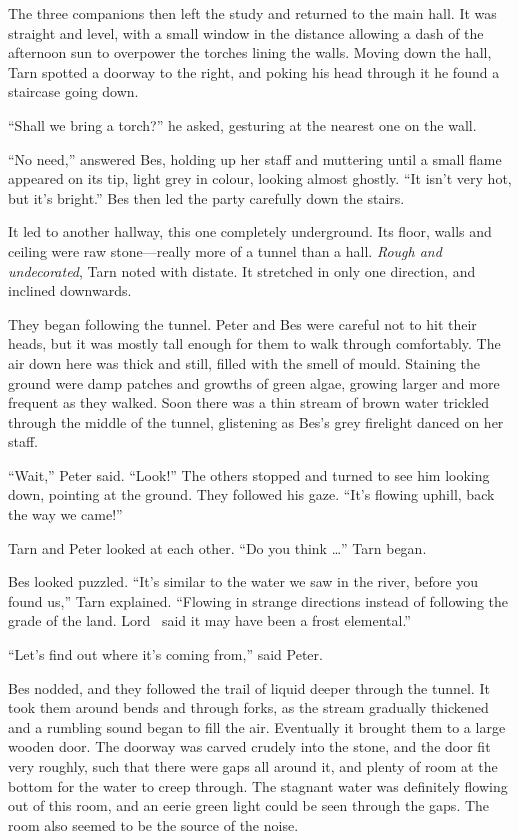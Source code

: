 The three companions then left the study and returned to the main hall.  It was straight and level, with a small window in the distance allowing a dash of the afternoon sun to overpower the torches lining the walls.  Moving down the hall, Tarn spotted a doorway to the right, and poking his head through it he found a staircase going down.

``Shall we bring a torch?'' he asked, gesturing at the nearest one on the wall.

``No need,'' answered Bes, holding up her staff and muttering until a small flame appeared on its tip, light grey in colour, looking almost ghostly.  ``It isn't very hot, but it's bright.'' Bes then led the party carefully down the stairs.

It led to another hallway, this one completely underground.  Its floor, walls and ceiling were raw stone---really more of a tunnel than a hall.  \emph{Rough and undecorated}, Tarn noted with distate.  It stretched in only one direction, and inclined downwards.

They began following the tunnel.  Peter and Bes were careful not to hit their heads, but it was mostly tall enough for them to walk through comfortably.  The air down here was thick and still, filled with the smell of mould.   Staining the ground were damp patches and growths of green algae, growing larger and more frequent as they walked.  Soon there was a thin stream of brown water trickled through the middle of the tunnel, glistening as Bes's grey firelight danced on her staff.

``Wait,'' Peter said.  ``Look!''  The others stopped and turned to see him looking down, pointing at the ground.  They followed his gaze.  ``It's flowing uphill, back the way we came!''

Tarn and Peter looked at each other.  ``Do you think \ldots'' Tarn began.

Bes looked puzzled.  ``It's similar to the water we saw in the river, before you found us,'' Tarn explained.  ``Flowing in strange directions instead of following the grade of the land.  Lord \arilor\ said it may have been a frost elemental.''

``Let's find out where it's coming from,'' said Peter.

Bes nodded, and they followed the trail of liquid deeper through the tunnel.  It took them around bends and through forks, as the stream gradually thickened and a rumbling sound began to fill the air.  Eventually it brought them to a large wooden door.  The doorway was carved crudely into the stone, and the door fit very roughly, such that there were gaps all around it, and plenty of room at the bottom for the water to creep through.  The stagnant water was definitely flowing out of this room, and an eerie green light could be seen through the gaps.  The room also seemed to be the source of the noise.

